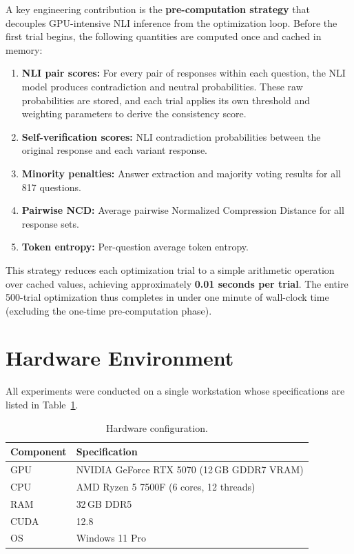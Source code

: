 A key engineering contribution is the \textbf{pre-computation strategy} that decouples GPU-intensive NLI inference from the optimization loop. Before the first trial begins, the following quantities are computed once and cached in memory:

\begin{enumerate}
    \item \textbf{NLI pair scores:} For every pair of responses within each question, the NLI model produces contradiction and neutral probabilities. These raw probabilities are stored, and each trial applies its own threshold and weighting parameters to derive the consistency score.

    \item \textbf{Self-verification scores:} NLI contradiction probabilities between the original response and each variant response.

    \item \textbf{Minority penalties:} Answer extraction and majority voting results for all 817 questions.

    \item \textbf{Pairwise NCD:} Average pairwise Normalized Compression Distance for all response sets.

    \item \textbf{Token entropy:} Per-question average token entropy.
\end{enumerate}

This strategy reduces each optimization trial to a simple arithmetic operation over cached values, achieving approximately \textbf{0.01 seconds per trial}. The entire 500-trial optimization thus completes in under one minute of wall-clock time (excluding the one-time pre-computation phase).

\section{Hardware Environment}
\label{sec:hardware}

All experiments were conducted on a single workstation whose specifications are listed in Table~\ref{tab:hardware}.

\begin{table}[!htbp]
    \centering
    \caption{Hardware configuration.}
    \label{tab:hardware}
    \begin{tabular}{ll}
        \toprule
        \textbf{Component} & \textbf{Specification} \\
        \midrule
        GPU   & NVIDIA GeForce RTX 5070 (12\,GB GDDR7 VRAM) \\
        CPU   & AMD Ryzen 5 7500F (6 cores, 12 threads) \\
        RAM   & 32\,GB DDR5 \\
        CUDA  & 12.8 \\
        OS    & Windows 11 Pro \\
        \bottomrule
    \end{tabular}
\end{table}

